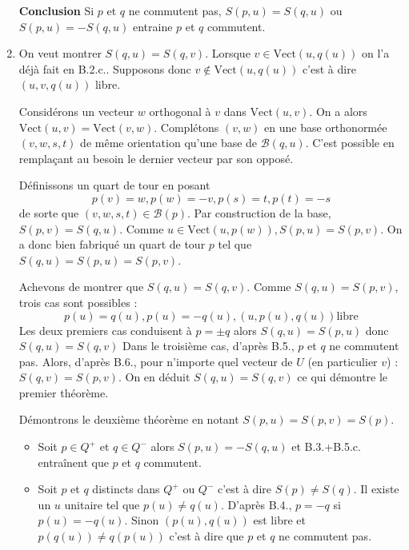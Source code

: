 \begin{enumerate}
\textbf{Conclusion} Si $p$ et $q$ ne commutent pas, $S(p,u)=S(q,u)$ ou $S(p,u)=-S(q,u)$ entraine $p$ et $q$ commutent.
\item On veut montrer $S(q,u)=S(q,v)$. Lorsque $v\in \mathrm{Vect}(u,q(u))$ on l'a déjà fait en B.2.c.. Supposons donc $v\not \in \mathrm{Vect}(u,q(u))$ c'est à dire $(u,v,q(u))$ libre.

Considérons un vecteur $w$ orthogonal à $v$ dans $\mathrm{Vect}(u,v)$. On a alors $\mathrm{Vect}(u,v)= \mathrm{Vect}(v,w)$. Complétons $(v,w)$ en une base orthonormée $(v,w,s,t)$ de même orientation qu'une base de $\mathcal{B}(q,u)$. C'est possible en remplaçant au besoin le dernier vecteur par son opposé.

Définissons un quart de tour en posant 
\[p(v)=w,p(w)=-v,p(s)=t,p(t)=-s\]
de sorte que $(v,w,s,t)\in \mathcal{B}(p)$. Par construction de la base, $S(p,v)=S(q,u)$. Comme $u\in\mathrm{Vect}(u,p(w)), S(p,u)=S(p,v)$. On a donc bien fabriqué un quart de tour $p$ tel que $S(q,u)=S(p,u)=S(p,v)$.

Achevons de montrer que $S(q,u)=S(q,v)$. Comme $S(q,u)=S(p,v)$, trois cas sont possibles : $$p(u)=q(u),p(u)=-q(u),(u,p(u),q(u))\mathrm{ libre}$$
Les deux premiers cas conduisent à $p=\pm q$ alors $S(q,u)=S(p,u)$ donc $S(q,u)=S(q,v)$ Dans le troisième cas, d'après B.5., $p$ et $q$ ne commutent pas. Alors, d'après B.6., pour n'importe quel vecteur de $U$ (en particulier $v$) : $S(q,v)=S(p,v)$. On en déduit $S(q,u)=S(q,v)$ ce qui démontre le premier théorème.

Démontrons le deuxième théorème en notant $S(p,u)=S(p,v)=S(p)$.
\begin{itemize}
\item Soit $p\in Q^{+}$ et $q\in Q^{-}$ alors $S(p,u)=-S(q,u)$ et B.3.+B.5.c. entraînent que $p$ et $q$ commutent.
\item Soit $p$ et $q$ distincts dans $Q^{+}$ ou $Q^{-}$ c'est à dire $S(p)\neq S(q)$. Il existe un $u$ unitaire tel que $p(u)\neq q(u)$. D'après B.4., $p=-q$ si $p(u)=-q(u)$. Sinon $(p(u),q(u))$ est libre et $p(q(u))\neq q(p(u))$ c'est à dire que $p$ et $q$ ne commutent pas.
\end{itemize}
\end{enumerate}
